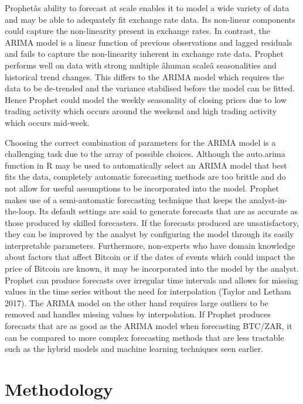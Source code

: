\documentclass[12pt,a4paper]{article}
\numberwithin{equation}{section}
\numberwithin{figure}{section}
\numberwithin{table}{section}
\begin{document}
Prophetâs ability to forecast at scale enables it to model a wide
variety of data and may be able to adequately fit exchange rate data.
Its non-linear components could capture the non-linearity present in
exchange rates. In contrast, the ARIMA model is a linear function of
previous observations and lagged residuals and fails to capture the
non-linearity inherent in exchange rate data. Prophet performs well on
data with strong multiple âhuman scaleâ seasonalities and historical
trend changes. This differs to the ARIMA model which requires the data
to be de-trended and the variance stabilised before the model can be
fitted. Hence Prophet could model the weekly seasonality of closing
prices due to low trading activity which occurs around the weekend and
high trading activity which occurs mid-week.

Choosing the correct combination of parameters for the ARIMA model is a
challenging task due to the array of possible choices. Although the
auto.arima function in R may be used to automatically select an ARIMA
model that best fits the data, completely automatic forecasting methods
are too brittle and do not allow for useful assumptions to be
incorporated into the model. Prophet makes use of a semi-automatic
forecasting technique that keeps the analyst-in-the-loop. Its default
settings are said to generate forecasts that are as accurate as those
produced by skilled forecasters. If the forecasts produced are
unsatisfactory, they can be improved by the analyst by configuring the
model through its easily interpretable parameters. Furthermore,
non-experts who have domain knowledge about factors that affect Bitcoin
or if the dates of events which could impact the price of Bitcoin are
known, it may be incorporated into the model by the analyst. Prophet can
produce forecasts over irregular time intervals and allows for missing
values in the time series without the need for interpolation (Taylor and
Letham 2017). The ARIMA model on the other hand requires large outliers
to be removed and handles missing values by interpolation. If Prophet
produces forecasts that are as good as the ARIMA model when forecasting
BTC/ZAR, it can be compared to more complex forecasting methods that are
less tractable such as the hybrid models and machine learning techniques
seen earlier.

\section{\texorpdfstring{Methodology
\label{Methodology}}{Methodology }}\label{methodology}
\end{document}
